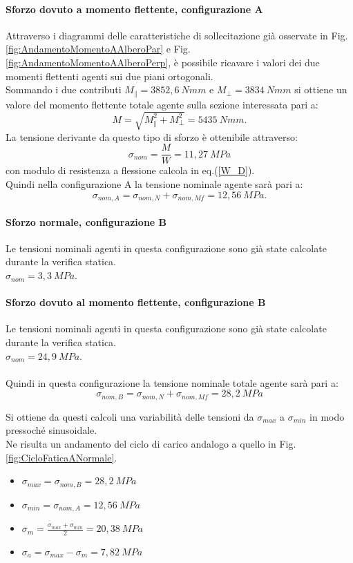 \paragraph{Sforzo dovuto a momento flettente, configurazione A} Attraverso i diagrammi delle caratteristiche di sollecitazione già osservate in Fig.\ref{fig:AndamentoMomentoAAlberoPar} e Fig.\ref{fig:AndamentoMomentoAAlberoPerp}, è possibile ricavare i valori dei due momenti flettenti agenti sui due piani ortogonali.\\ 
Sommando i due contributi $M_{\parallel}=3852,6\ Nmm$ e $M_{\perp}=3834\ Nmm$ si ottiene un valore del momento flettente totale agente sulla sezione interessata pari a:
\begin{equation}
    M=\sqrt{M_{\parallel}^2+M_{\perp}^2}=5435\ Nmm.
\end{equation}
La tensione derivante da questo tipo di sforzo è ottenibile attraverso:
\begin{equation}
    \sigma_{nom}=\frac{M}{W}=11,27\ MPa
\end{equation}
con modulo di resistenza a flessione calcola in eq.(\ref{W_D}).\\
Quindi nella configurazione A la tensione nominale agente sarà pari a:
\begin{equation}
    \sigma_{nom,A}=\sigma_{nom,N}+\sigma_{nom,Mf}=12,56\ MPa.
\end{equation}
\paragraph{Sforzo normale, configurazione B} 
Le tensioni nominali agenti in questa configurazione sono già state calcolate durante la verifica statica.\\
$\sigma_{nom}=3,3\ MPa$.
\paragraph{Sforzo dovuto al momento flettente, configurazione B}
Le tensioni nominali agenti in questa configurazione sono già state calcolate durante la verifica statica.\\
$\sigma_{nom}=24,9\ MPa$.\\
\\
Quindi in questa configurazione la tensione nominale totale agente sarà pari a:
\begin{equation}
    \sigma_{nom,B}=\sigma_{nom,N}+\sigma_{nom,Mf}=28,2\ MPa
\end{equation}

Si ottiene da questi calcoli una variabilità delle tensioni da $\sigma_{max}$ a $\sigma_{min}$ in modo pressoché sinusoidale.\\
Ne risulta un andamento del ciclo di carico andalogo a quello in Fig.\ref{fig:CicloFaticaANormale}.
\begin{itemize}
    \item $\sigma_{max}=\sigma_{nom,B}=28,2\ MPa$
    \item $\sigma_{min}=\sigma_{nom,A}=12,56\ MPa$
    \item $\sigma_m=\frac{\sigma_{max}+\sigma_{min}}{2}=20,38\ MPa$
    \item $\sigma_a=\sigma_{max}-\sigma_m=7,82\ MPa$
\end{itemize}
